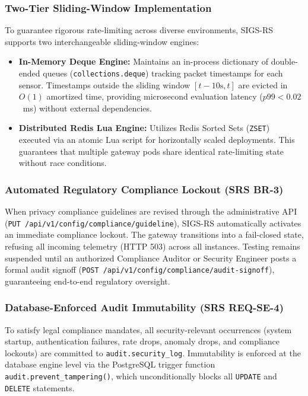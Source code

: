 \subsubsection{Two-Tier Sliding-Window Implementation}
To guarantee rigorous rate-limiting across diverse environments, SIGS-RS supports two interchangeable sliding-window engines:
\begin{itemize}
    \item \textbf{In-Memory Deque Engine:} Maintains an in-process dictionary of double-ended queues (\texttt{collections.deque}) tracking packet timestamps for each sensor. Timestamps outside the sliding window $[t - 10\text{s}, t]$ are evicted in $O(1)$ amortized time, providing microsecond evaluation latency ($p99 < 0.02$~ms) without external dependencies.
    \item \textbf{Distributed Redis Lua Engine:} Utilizes Redis Sorted Sets (\texttt{ZSET}) executed via an atomic Lua script for horizontally scaled deployments. This guarantees that multiple gateway pods share identical rate-limiting state without race conditions.
\end{itemize}

\subsubsection{Automated Regulatory Compliance Lockout (SRS BR-3)}
When privacy compliance guidelines are revised through the administrative API (\texttt{PUT /api/v1/config/compliance/guideline}), SIGS-RS automatically activates an immediate compliance lockout. The gateway transitions into a fail-closed state, refusing all incoming telemetry (HTTP 503) across all instances. Testing remains suspended until an authorized Compliance Auditor or Security Engineer posts a formal audit signoff (\texttt{POST /api/v1/config/compliance/audit-signoff}), guaranteeing end-to-end regulatory oversight.

\subsubsection{Database-Enforced Audit Immutability (SRS REQ-SE-4)}
To satisfy legal compliance mandates, all security-relevant occurrences (system startup, authentication failures, rate drops, anomaly drops, and compliance lockouts) are committed to \texttt{audit.security\_log}. Immutability is enforced at the database engine level via the PostgreSQL trigger function \texttt{audit.prevent\_tampering()}, which unconditionally blocks all \texttt{UPDATE} and \texttt{DELETE} statements.

